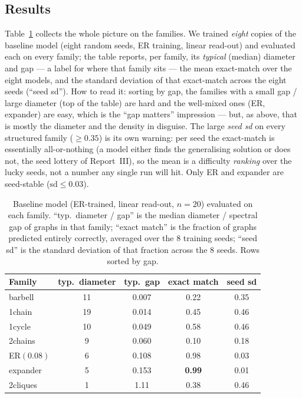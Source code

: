 \documentclass[11pt,a4paper]{article}
\begin{document}
\subsection{Results}
\label{sec:third-fam}

Table~\ref{tab:fam} collects the whole picture on the families. We trained \emph{eight}
copies of the baseline model (eight random seeds, ER training, linear read-out) and evaluated
each on every family; the table reports, per family, its \emph{typical} (median) diameter and
gap --- a label for where that family sits --- the mean exact-match over the eight models, and
the standard deviation of that exact-match across the eight seeds (``seed sd''). How to read
it: sorting by gap, the families with a small gap / large diameter (top of the table) are
hard and the well-mixed ones (ER, expander) are easy, which is the ``gap matters'' impression
--- but, as above, that is mostly the diameter and the density in disguise. The large
\emph{seed sd} on every structured family ($\ge0.35$) is its own warning: per seed the
exact-match is essentially all-or-nothing (a model either finds the generalising solution or
does not, the seed lottery of Report~III), so the mean is a difficulty \emph{ranking} over the
lucky seeds, not a number any single run will hit. Only ER and expander are seed-stable
($\mathrm{sd}\le0.03$).

\begin{table}[H]
\centering
\begin{tabular}{lcccc}
\toprule
Family & typ.\ diameter & typ.\ gap & exact match & seed sd \\
\midrule
barbell           & 11 & 0.007 & 0.22 & 0.35 \\
1chain            & 19 & 0.014 & 0.45 & 0.46 \\
1cycle            & 10 & 0.049 & 0.58 & 0.46 \\
2chains           & \phantom{0}9 & 0.060 & 0.10 & 0.18 \\
ER$(0.08)$        & \phantom{0}6 & 0.108 & 0.98 & 0.03 \\
expander          & \phantom{0}5 & 0.153 & \textbf{0.99} & 0.01 \\
2cliques          & \phantom{0}1 & 1.11 & 0.38 & 0.46 \\
\bottomrule
\end{tabular}
\caption{Baseline model (ER-trained, linear read-out, $n=20$) evaluated on each family.
``typ.\ diameter / gap'' is the median diameter / spectral gap of graphs in that family;
``exact match'' is the fraction of graphs predicted entirely correctly, averaged over the $8$
training seeds; ``seed sd'' is the standard deviation of that fraction across the $8$ seeds.
Rows sorted by gap.}
\label{tab:fam}
\end{table}
\end{document}
